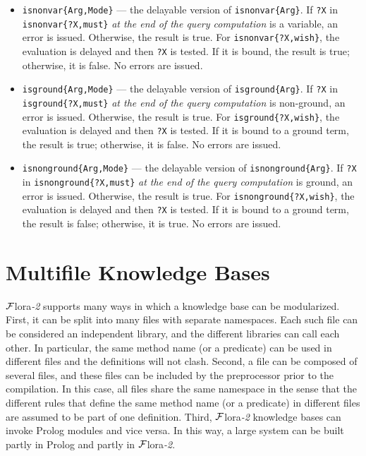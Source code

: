 \documentclass[11pt]{article}
\newcommand{\FLORA}{{\mbox{\sc ${\cal F}${lora}\rm\emph{-2}}}\xspace}
\newcommand{\FLSYSTEM}{\FLORA}
\begin{document}
\begin{itemize}
  For \texttt{isvar\{?X,wish\}}, the
  evaluation is delayed and then \texttt{?X} is tested. If it is unbound,
  the result is true; otherwise, it is false. No errors are issued. 
\item \texttt{isnonvar\{Arg,Mode\}} --- the delayable version of
  \texttt{isnonvar\{Arg\}}.  If \texttt{?X} in
  \texttt{isnonvar\{?X,must\}} \emph{at the end of the query computation} is a
  variable, an error is issued. Otherwise, the result is true.
  For \texttt{isnonvar\{?X,wish\}}, the evaluation is delayed and then
  \texttt{?X} is tested. If it is bound, the result is true; otherwise,
  it is false. No errors are issued.
\item \texttt{isground\{Arg,Mode\}} --- the delayable version of
  \texttt{isground\{Arg\}}.  If \texttt{?X} in
  \texttt{isground\{?X,must\}} \emph{at the end of the query computation}
  is non-ground, an error is issued. Otherwise, the result is true.
  For \texttt{isground\{?X,wish\}}, the
  evaluation is delayed and then \texttt{?X} is tested. If it is bound to a
  ground term, the result is true; otherwise, it is false. No errors are
  issued.
\item \texttt{isnonground\{Arg,Mode\}} --- the delayable version of
  \texttt{isnonground\{Arg\}}.  If \texttt{?X} in
  \texttt{isnonground\{?X,must\}} \emph{at the end of the query computation}
  is ground, an error is issued. Otherwise, the result is true.
  For \texttt{isnonground\{?X,wish\}}, the
  evaluation is delayed and then \texttt{?X} is tested. If it is bound to a
  ground term, the result is false; otherwise, it is true. No errors are
  issued.
\end{itemize}



\section{Multifile Knowledge Bases}

\FLSYSTEM supports many ways in which a knowledge base can be modularized.
First, it
can be split into many files with separate namespaces. Each
such file can be considered an independent library, and the different
libraries can call each other. In particular, the same method name (or a
predicate) can be used in different files and the definitions will not
clash.  Second, a file can be composed of several files, and these
files can be included by the preprocessor prior to the compilation. In this
case, all files share the same namespace in the sense that the different
rules that define the same method name (or a predicate) in different files
are assumed to be part of one definition. Third, \FLSYSTEM knowledge bases
can invoke
Prolog modules and vice versa. In this way, a large system can be built partly
in Prolog and partly in \FLSYSTEM.
\end{document}
